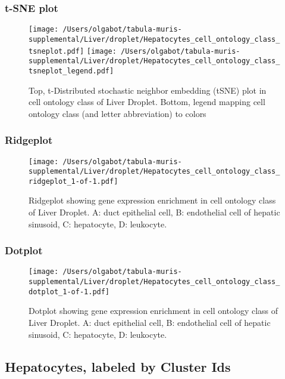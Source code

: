 \clearpage
\subsubsection{t-SNE plot}
\begin{figure}[h]
\centering
\texttt{[image: /Users/olgabot/tabula-muris-supplemental/Liver/droplet/Hepatocytes\_cell\_ontology\_class\_tsneplot.pdf]}
\texttt{[image: /Users/olgabot/tabula-muris-supplemental/Liver/droplet/Hepatocytes\_cell\_ontology\_class\_tsneplot\_legend.pdf]}
\caption{Top, t-Distributed stochastic neighbor embedding (tSNE) plot  in cell ontology class of Liver Droplet. Bottom, legend mapping cell ontology class (and letter abbreviation) to colors}
\end{figure}


\clearpage
\clearpage
\subsubsection{Ridgeplot}
\begin{figure}[h]
\centering
\texttt{[image: /Users/olgabot/tabula-muris-supplemental/Liver/droplet/Hepatocytes\_cell\_ontology\_class\_ridgeplot\_1-of-1.pdf]}

\caption{ Ridgeplot  showing gene expression enrichment in cell ontology class of Liver Droplet. A: duct epithelial cell, B: endothelial cell of hepatic sinusoid, C: hepatocyte, D: leukocyte.}
\end{figure}


\clearpage
\clearpage
\subsubsection{Dotplot}
\begin{figure}[h]
\centering
\texttt{[image: /Users/olgabot/tabula-muris-supplemental/Liver/droplet/Hepatocytes\_cell\_ontology\_class\_dotplot\_1-of-1.pdf]}

\caption{ Dotplot  showing gene expression enrichment in cell ontology class of Liver Droplet. A: duct epithelial cell, B: endothelial cell of hepatic sinusoid, C: hepatocyte, D: leukocyte.}
\end{figure}


\clearpage
\subsection{Hepatocytes, labeled by Cluster Ids}
